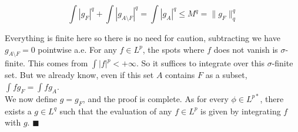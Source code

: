\documentclass[../../main.tex]{subfiles}
\begin{document}
$$
\int |g_F|^q + \int |g_{A\setminus F}|^q = \int |g_A|^q \leq M^q = \lVert g_F \rVert^q_q
$$

Everything is finite here so there is no need for caution, subtracting we have $g_{A\setminus F} = 0$ pointwise a.e. For any $f\in L^p$, the spots where $f$ does not vanish is $\sigma$-finite. This comes from $\int |f|^p < +\infty$. So it suffices to integrate over this $\sigma$-finite set. But we already know, even if this set $A$ contains $F$ as a subset,  $\int fg_{F} = \int fg_{A}$.\\

We now define $g = g_F$, and the proof is complete. As for every $\phi\in L^{p*}$, there exists a $g\in L^q$ such that the evaluation of any $f\in L^p$ is given by integrating $f$ with $g$. $\blacksquare$
\end{document}
